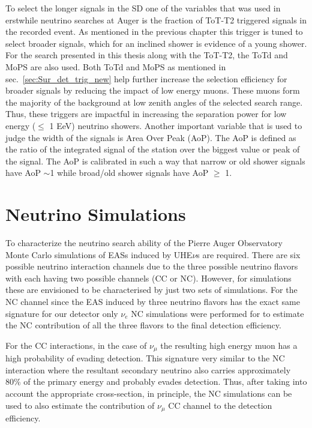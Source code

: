 To select the longer signals in the SD one of the variables that was used in erstwhile neutrino searches at Auger is the fraction of ToT-T2 triggered signals in the recorded event. As mentioned in the previous chapter this trigger is tuned to select broader signals, which for an inclined shower is evidence of a young shower. For the search presented in this thesis along with the ToT-T2, the ToTd and MoPS are also used. Both ToTd and MoPS as mentioned in sec.~\ref{sec:Sur_det_trig_new} help further increase the selection efficiency for broader signals by reducing the impact of low energy muons. These muons form the majority of the background at low zenith angles of the selected search range. Thus, these triggers are impactful in increasing the separation power for low energy ($\leq$ 1 EeV) neutrino showers. Another important variable that is used to judge the width of the signals is Area Over Peak (AoP). The AoP is defined as the ratio of the integrated signal of the station over the biggest value or peak of the signal. The AoP is calibrated in such a way that narrow or old shower signals have AoP $\sim$1 while broad/old shower signals have AoP $\geqslant$ 1. 



\section{Neutrino Simulations}
\label{sec:sim_DGL}
To characterize the neutrino search ability of the Pierre Auger Observatory Monte Carlo simulations of EASs induced by UHE$\nu$s are required. There are six possible neutrino interaction channels due to the three possible neutrino flavors with each having two possible channels (CC or NC). However, for simulations these are envisioned to be characterised by just two sets of simulations. For the NC channel since the EAS induced by three neutrino flavors has the exact same signature for our detector only $\nu_e$ NC simulations were performed for to estimate the NC contribution of all the three flavors to the final detection efficiency. 

For the CC interactions, in the case of $\nu_{\mu}$ the resulting high energy muon has a high probability of evading detection. This signature very similar to the NC interaction where the resultant secondary neutrino also carries approximately 80\% of the primary energy and probably evades detection. Thus, after taking into account the appropriate cross-section, in principle, the NC simulations can be used to also estimate the contribution of $\nu_{\mu}$ CC channel to the detection efficiency.  

